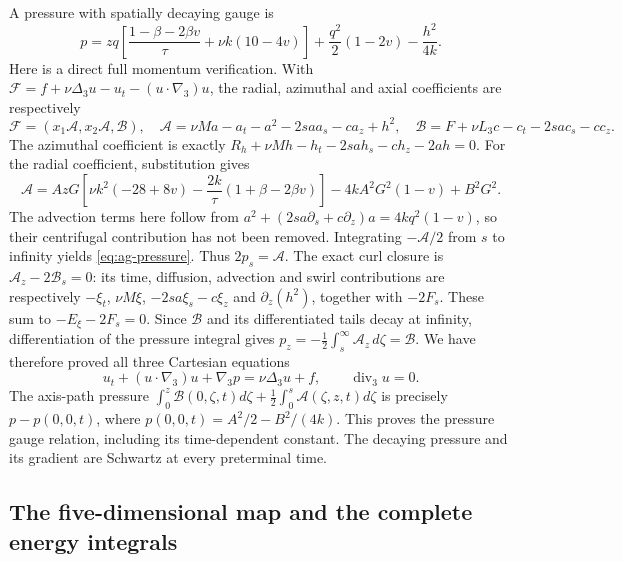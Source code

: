 A pressure with spatially decaying gauge is
\begin{equation}\label{eq:ag-pressure}
 p=zq\left[\frac{1-\beta-2\beta v}{\tau}+\nu k(10-4v)\right]
       +\frac{q^2}{2}(1-2v)-\frac{h^2}{4k}.
\end{equation}
Here is a direct full momentum verification.  With
\(\mathcal F=f+\nu\Delta_3u-u_t-(u\cdot\nabla_3)u\), the radial,
azimuthal and axial coefficients are respectively
\[
 \mathcal F=(x_1\mathcal A,x_2\mathcal A,\mathcal B),\quad
 \mathcal A=\nu Ma-a_t-a^2-2s a a_s-c a_z+h^2,
 \quad \mathcal B=F+\nu L_3c-c_t-2s a c_s-c c_z.
\]
The azimuthal coefficient is exactly
\(R_h+\nu Mh-h_t-2s a h_s-c h_z-2ah=0\).
For the radial coefficient, substitution gives
\begin{equation}\label{eq:ag-radial-pressure-coefficient}
 \mathcal A=
 A zG\left[\nu k^2(-28+8v)-\frac{2k}{\tau}(1+\beta-2\beta v)\right]
       -4kA^2G^2(1-v)+B^2G^2.
\end{equation}
The advection terms here follow from
\(a^2+(2s a\partial_s+c\partial_z)a=4kq^2(1-v)\), so their
centrifugal contribution has not been removed.
Integrating \(-\mathcal A/2\) from \(s\) to infinity yields
\eqref{eq:ag-pressure}.  Thus \(2p_s=\mathcal A\).
The exact curl closure is \(\mathcal A_z-2\mathcal B_s=0\): its time,
diffusion, advection and swirl contributions are respectively
\(-\xi_t\), \(\nu M\xi\), \(-2s a\xi_s-c\xi_z\) and
\(\partial_z(h^2)\), together with \(-2F_s\).  These sum to
\(-E_\xi-2F_s=0\).  Since \(\mathcal B\) and its differentiated
tails decay at infinity, differentiation of the pressure integral gives
\(p_z=-\tfrac12\int_s^\infty\mathcal A_z\,d\zeta=\mathcal B\).
We have therefore proved all three Cartesian equations
\begin{equation}\label{eq:ag-momentum}
 u_t+(u\cdot\nabla_3)u+\nabla_3p=\nu\Delta_3u+f,
 \qquad \operatorname{div}_3u=0.
\end{equation}
The axis-path pressure
\(\int_0^z\mathcal B(0,\zeta,t)d\zeta+\tfrac12\int_0^s\mathcal A(\zeta,z,t)d\zeta\)
is precisely \(p-p(0,0,t)\), where
\(p(0,0,t)=A^2/2-B^2/(4k)\).  This proves the pressure gauge relation,
including its time-dependent constant.  The decaying pressure and its
gradient are Schwartz at every preterminal time.

\subsection{The five-dimensional map and the complete energy integrals}

